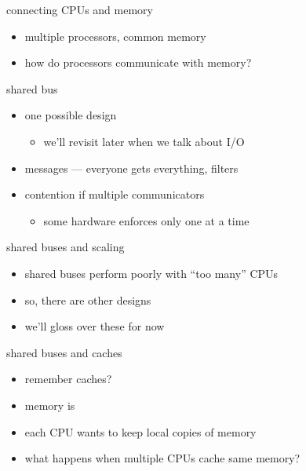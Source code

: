 \usetikzlibrary{arrows.meta,matrix}

\begin{frame}{connecting CPUs and memory}
    \begin{itemize}
    \item multiple processors, common memory
    \item how do processors communicate with memory?
    \end{itemize}
\end{frame}

\begin{frame}{shared bus}
\begin{itemize}
\item one possible design
    \begin{itemize}
    \item we'll revisit later when we talk about I/O
    \end{itemize}
\item {} messages --- everyone gets everything, filters
\item contention if multiple communicators
    \begin{itemize}
    \item some hardware enforces only one at a time
    \end{itemize}
\end{itemize}
\end{frame}

\begin{frame}{shared buses and scaling}
    \begin{itemize}
    \item shared buses perform poorly with ``too many'' CPUs
    \item so, there are other designs
        \vspace{.5cm}
    \item we'll gloss over these for now
    \end{itemize}
\end{frame}

\begin{frame}{shared buses and caches}
    \begin{itemize}
    \item remember caches?
    \item memory is 
    \item each CPU wants to keep local copies of memory
        \vspace{.5cm}
    \item what happens when multiple CPUs cache same memory?
    \end{itemize}
\end{frame}
